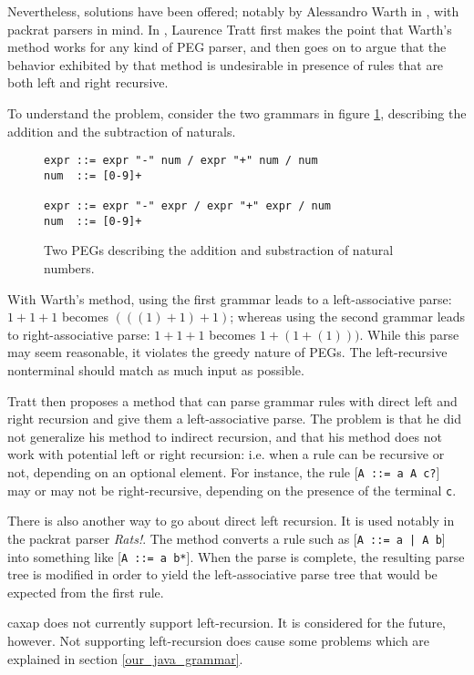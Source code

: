 Nevertheless, solutions have been offered; notably by Alessandro Warth in
\cite{warth2008}, with packrat parsers in mind. In \cite{tratt2010}, Laurence
Tratt first makes the point that Warth’s method works for any kind of PEG
parser, and then goes on to argue that the behavior exhibited by that method is
undesirable in presence of rules that are both left and right recursive.

To understand the problem, consider the two grammars in figure
\ref{left_recur_grammars}, describing the addition and the subtraction of
naturals.

\begin{figure}[here]
\small
\begin{lstlisting}[frame=single]
expr ::= expr "-" num / expr "+" num / num
num  ::= [0-9]+

expr ::= expr "-" expr / expr "+" expr / num
num  ::= [0-9]+
\end{lstlisting}
\caption{Two PEGs describing the addition and substraction of natural numbers.}
\label{left_recur_grammars}
\end{figure}

With Warth’s method, using the first grammar leads to a left-associative parse:
$1 + 1 + 1$ becomes $(((1) + 1) + 1)$; whereas using the second grammar leads to
right-associative parse: $1 + 1 + 1$ becomes $1 + ( 1 + (1)))$. While this parse
may seem reasonable, it violates the greedy nature of PEGs. The left-recursive
nonterminal should match as much input as possible.

Tratt then proposes a method that can parse grammar rules with direct left and
right recursion and give them a left-associative parse. The problem is that he
did not generalize his method to indirect recursion, and that his method does
not work with potential left or right recursion: i.e. when a rule can be
recursive or not, depending on an optional element. For instance, the rule
[\lstinline{A ::= a A c?}] may or may not be right-recursive, depending on the
presence of the terminal \texttt{c}.

There is also another way to go about direct left recursion. It is used notably
in the packrat parser \emph{Rats!}. \cite{grimm2006} The method converts a rule
such as [\lstinline{A ::= a | A b}] into something like
[\lstinline{A ::= a b*}]. When the parse is complete, the resulting parse tree
is modified in order to yield the left-associative parse tree that would be
expected from the first rule.

caxap does not currently support left-recursion. It is considered for the
future, however. Not supporting left-recursion does cause some problems which
are explained in section \ref{our_java_grammar}.

